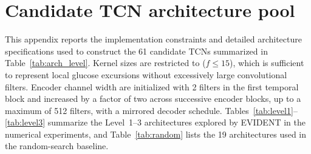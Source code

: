 \documentclass[preprint,12pt]{elsarticle}
\begin{document}
\section{Candidate TCN architecture pool}
\label{app:architecture_pool}
This appendix reports the implementation constraints and detailed architecture specifications used to construct the 61 candidate TCNs summarized in Table~\ref{tab:arch_level}.
Kernel sizes are restricted to ($f \le 15$), which is sufficient to represent local glucose excursions without excessively large convolutional filters. 
Encoder channel width are initialized with 2 filters in the first temporal block and increased by a factor of two across successive encoder blocks, up to a maximum of 512 filters, with a mirrored decoder schedule.
Tables~\ref{tab:level1}--\ref{tab:level3} summarize the Level~1--3 architectures explored by EVIDENT in the numerical experiments, and Table~\ref{tab:random} lists the 19 architectures used in the random-search baseline.
\end{document}
